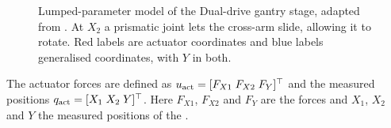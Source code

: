 \begin{figure}[b]
  \centering
  \def\gantryabsorber{0}%
  
  \caption{
  Lumped-parameter model of the Dual-drive gantry stage, adapted from   
  \cite{garcia2013model}.
  At $X_2$ a prismatic joint lets the cross-arm slide, allowing it to rotate.
  Red labels are actuator coordinates and blue labels generalised coordinates,
  with $Y$ in both.}
  \label{fig:gantry_system}
\end{figure}
%
The actuator forces are defined as
$u_{\mathrm{act}}=[F_{X1}\;F_{X2}\;F_Y]^\top$ and the measured positions
$q_{\mathrm{act}}=[X_1\;X_2\;Y]^\top$.
Here $F_{X1}$, $F_{X2}$ and $F_Y$ are the forces and
$X_1$, $X_2$ and $Y$ the measured positions of the
%
.

